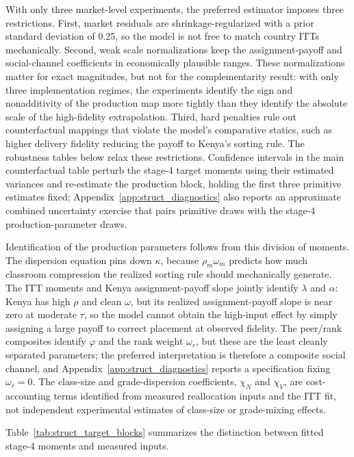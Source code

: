 \documentclass[11pt]{article}
\begin{document}
With only three market-level experiments, the preferred estimator imposes three restrictions. First, market residuals are shrinkage-regularized with a prior standard deviation of 0.25, so the model is not free to match country ITTs mechanically. Second, weak scale normalizations keep the assignment-payoff and social-channel coefficients in economically plausible ranges. These normalizations matter for exact magnitudes, but not for the complementarity result: with only three implementation regimes, the experiments identify the sign and nonadditivity of the production map more tightly than they identify the absolute scale of the high-fidelity extrapolation. Third, hard penalties rule out counterfactual mappings that violate the model's comparative statics, such as higher delivery fidelity reducing the payoff to Kenya's sorting rule. The robustness tables below relax these restrictions. Confidence intervals in the main counterfactual table perturb the stage-4 target moments using their estimated variances and re-estimate the production block, holding the first three primitive estimates fixed; Appendix~\ref{app:struct_diagnostics} also reports an approximate combined uncertainty exercise that pairs primitive draws with the stage-4 production-parameter draws.

Identification of the production parameters follows from this division of moments. The dispersion equation pins down $\kappa$, because $\rho_m\omega_m$ predicts how much classroom compression the realized sorting rule should mechanically generate. The ITT moments and Kenya assignment-payoff slope jointly identify $\lambda$ and $\alpha$: Kenya has high $\rho$ and clean $\omega$, but its realized assignment-payoff slope is near zero at moderate $\tau$, so the model cannot obtain the high-input effect by simply assigning a large payoff to correct placement at observed fidelity. The peer/rank composites identify $\varphi$ and the rank weight $\omega_r$, but these are the least cleanly separated parameters; the preferred interpretation is therefore a composite social channel, and Appendix~\ref{app:struct_diagnostics} reports a specification fixing $\omega_r=0$. The class-size and grade-dispersion coefficients, $\chi_N$ and $\chi_V$, are cost-accounting terms identified from measured reallocation inputs and the ITT fit, not independent experimental estimates of class-size or grade-mixing effects.

Table~\ref{tab:struct_target_blocks} summarizes the distinction between fitted stage-4 moments and measured inputs.
\end{document}
